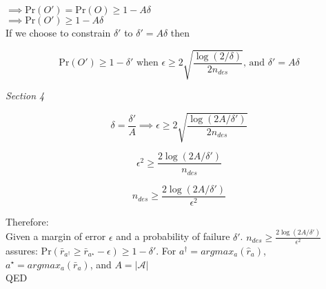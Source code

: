 \documentclass{article}
\begin{document}
$\implies \mathrm{Pr}\left(O'\right) = \mathrm{Pr}\left(O\right) \geq 1 - A\delta$ \\

$\implies \mathrm{Pr}\left(O'\right) \geq 1 - A\delta$ \\

If we choose to constrain $\delta'$ to $\delta' = A\delta$ then

$$\mathrm{Pr}\left(O'\right) \geq 1 - \delta' \text{ when $\epsilon \geq 2 \sqrt{\frac{\log (2/\delta)}{2n_{des}}}$, and $\delta' = A\delta$}$$

\textit{Section 4}

$$\delta = \frac{\delta'}{A} \implies \epsilon \geq 2 \sqrt{\frac{\log (2A/\delta')}{2n_{des}}}$$

$$\epsilon^{2} \geq \frac{2 \log (2A/\delta')}{n_{des}}$$

$$n_{des} \geq \frac{2 \log (2A/\delta')}{\epsilon^{2}}$$

Therefore: \\

Given a margin of error $\epsilon$ and a probability of failure $\delta'$. $n_{des} \geq \frac{2 \log (2A/\delta')}{\epsilon^{2}}$ assures: $\mathrm{Pr}\left(\bar{r}_{a^{\dagger}} \geq \bar{r}_{a^{\star}} - \epsilon\right) \geq 1 - \delta'$. For $a^{\dagger} = argmax_{a}(\hat{r}_{a})$, $a^{\star} = argmax_{a}(\bar{r}_{a})$, and $A=|\mathcal{A}|$ \\

QED
\end{document}
